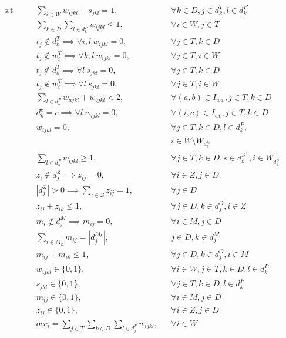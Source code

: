 \documentclass[../../thesis.tex]{subfiles}
\begin{document}
\begin{align*}
    \textrm{s.t} \qquad & \sum_{i \in W} w_{ijkl} + s_{jkl} = 1, && \forall k \in D, j \in d_k^T, l \in d_k^P \\
    & \sum_{k \in D} \sum_{l \in d_k^P} w_{ijkl} \leq 1, && \forall i \in W, j \in T  \\
    & t_j \notin d^T_{k} \implies \forall i, l \ w_{ijkl} = 0,  && \forall j \in T , k \in D \\
    & t_j \notin w^T_{i} \implies \forall k, l \ w_{ijkl} = 0, && \forall j \in T, i \in W  \\ 
    & t_j \notin d^T_{k} \implies \forall l \ s_{jkl} = 0,  && \forall j \in T , k \in D  \\
    & t_j \notin w^T_{i} \implies \forall l \ s_{jkl} = 0, && \forall j \in T, i \in W  \\ 
    & \sum_{l \in d^P_k} w_{ajkl} + w_{bjkl} < 2, &&  \forall {(a, b) \in I_{ww}}, j \in T, k \in D \\
    & d^c_{k} = c \implies \forall l \ w_{ijkl} = 0, && \forall {(i, c) \in I_{wc}}, j \in T, k \in D  \\ 
    & w_{ijkl} = 0, && \forall j \in T, k \in D, l \in d^P_k,  \\
    & && i \in W \setminus W_{d^{s_l}_k} \\
    & \sum_{l \in d_k^P} w_{ijkl} \geq 1, && \forall j \in T, k \in D, s \in d^{S^+}_k, i \in W_{d^{S^+}_k}  \\
    & z_i \notin d^Z_j \implies z_{ij} = 0, && \forall i \in Z, j \in D   \\
    & |d^Z_j| > 0 \implies \sum_{i \in Z} z_{ij} = 1, && \forall j \in D \\
    & z_{ij} + z_{ik} \leq 1, && \forall j \in D, k \in d^O_j, i \in Z \\
    & m_i \notin d^M_j \implies m_{ij} = 0, && \forall i \in M, j \in D   \\
    & \sum_{i \in M_k} m_{ij} = |d^{M_k}_j|, && j \in D, k \in d^M_j  \\
    & m_{ij} + m_{ik} \leq 1, && \forall j \in D, k \in d^O_j, i \in M  \\
    & w_{ijkl} \in \{0, 1\}, && \forall i \in W, j \in T, k \in D, l \in d^P_k  \\
    & s_{jkl} \in \{0, 1\}, && \forall j \in T, k \in D, l \in d^P_k  \\
    & m_{ij} \in \{0, 1\}, && \forall i \in M, j \in D  \\ 
    & z_{ij} \in \{0, 1\}, && \forall i \in Z, j \in D  \\ 
    & occ_i = \sum_{j \in T} \sum_{k \in D} \sum_{l \in d^P_j} w_{ijkl}, && \forall i \in W 
\end{align*}
\endgroup
\end{document}
